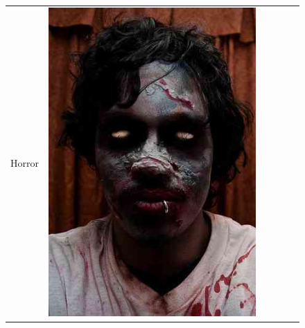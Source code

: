 \begin{figure}
\centering
    \begin{tabular}{m{.01\linewidth} m{.16\linewidth} m{.16\linewidth} m{.16\linewidth} m{.16\linewidth} m{.16\linewidth}}
    \begin{turn}{90}{Horror}\end{turn} &
    \includegraphics[width=\linewidth]{../style/figures/flickr_on_flickr/pred_style_Horror/0.jpg} &

\end{tabular}
\end{figure}
